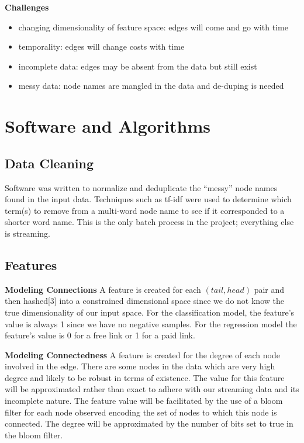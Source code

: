 \documentclass{article} %
\begin{document}
\textbf{Challenges}
\begin{itemize}
\item changing dimensionality of feature space: edges will come and go with time
\item temporality: edges will change costs with time
\item incomplete data: edges may be absent from the data but still exist
\item messy data: node names are mangled in the data and de-duping is needed
\end{itemize}

\section{Software and Algorithms}

\subsection{Data Cleaning}
Software was written to normalize and deduplicate the ``messy'' node names
found in the input data.  Techniques such as tf-idf were used to determine
which term(s) to remove from a multi-word node name to see if it
corresponded to a shorter word name.  This is the only batch process in the project; everything else is streaming.

\subsection{Features}

\textbf{Modeling Connections} A feature is created for each $(tail,head)$ pair and then hashed[3] into a
constrained dimensional space since we do not know the true dimensionality
of our input space.  For the classification model, the feature's value is always 1
since we have no negative samples.  For the regression model the feature's value is 0
for a free link or 1 for a paid link.

\textbf{Modeling Connectedness} A feature is created for the degree of each node
  involved in the edge.  There are some nodes in
  the data which are very high degree and likely to be robust in terms of
  existence.  The value for this feature will be approximated rather than
  exact to adhere with our streaming data and its incomplete nature.  The feature value will be facilitated by the use of a
  bloom filter for each node observed encoding the set of nodes to which
  this node is connected.  The degree will be approximated by the
  number of bits set to true in the bloom filter.  
\end{document}
